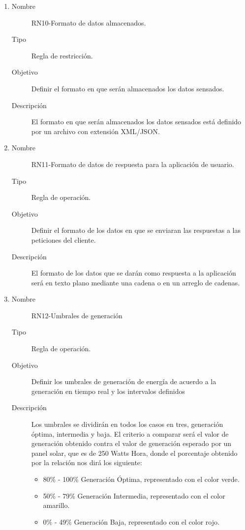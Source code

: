 \begin{enumerate}[label=RN\arabic*.]

\item \label{RN10}
		\begin{description}
			\item[Nombre] RN10-Formato de datos almacenados.
			\item[Tipo] Regla de restricción.
			\item[Objetivo] Definir el formato en que serán almacenados los datos sensados.
			\item[Descripción] El formato en que serán almacenados los datos sensados está definido por un archivo con extensión XML/JSON. 
		\end{description}
		
\item \label{RN11}
		\begin{description}
			\item[Nombre] RN11-Formato de datos de respuesta para la aplicación de usuario.
			\item[Tipo] Regla de operación.
			\item[Objetivo] Definir el formato de los datos en que se enviaran las respuestas a las peticiones del cliente.
			\item[Descripción] El formato de los datos que se darán como respuesta a la aplicación será en texto plano mediante una cadena o en un arreglo de cadenas.
		\end{description}
		
\item \label{RN12}
		\begin{description}
			\item[Nombre] RN12-Umbrales de generación
			\item[Tipo] Regla de operación.
			\item[Objetivo] Definir los umbrales de generación de energía de acuerdo a la generación en tiempo real y los intervalos definidos 
			\item[Descripción] Los umbrales se dividirán en todos los casos en tres, generación óptima, intermedia y baja.
			El criterio a comparar será el valor de generación obtenido contra el valor de generación esperado por un panel solar, que es de 250 Watts Hora, donde el porcentaje obtenido por la relación nos dirá los siguiente:
			\begin{itemize}
			    \item 80\% - 100\% Generación Óptima, representado con el color verde.
			    \item 50\% - 79\% Generación Intermedia, representado con el color amarillo.
			    \item 0\% - 49\% Generación Baja, representado con el color rojo.
			\end{itemize}
		\end{description}
	

\end{enumerate}
